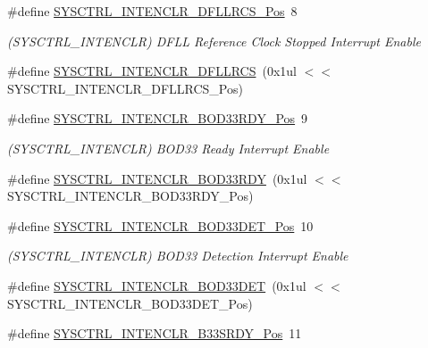 \begin{DoxyCompactItemize}
\item 
\#define \mbox{\hyperlink{group___s_a_m_d21___s_y_s_c_t_r_l_gaac16f8dcaad95639676e9876e47f3d9a}{S\+Y\+S\+C\+T\+R\+L\+\_\+\+I\+N\+T\+E\+N\+C\+L\+R\+\_\+\+D\+F\+L\+L\+R\+C\+S\+\_\+\+Pos}}~8
\begin{DoxyCompactList}\small\item\em (S\+Y\+S\+C\+T\+R\+L\+\_\+\+I\+N\+T\+E\+N\+C\+LR) D\+F\+LL Reference Clock Stopped Interrupt Enable \end{DoxyCompactList}\item 
\#define \mbox{\hyperlink{group___s_a_m_d21___s_y_s_c_t_r_l_ga9cbe6f9fc03e07ab60179a11784bf8c2}{S\+Y\+S\+C\+T\+R\+L\+\_\+\+I\+N\+T\+E\+N\+C\+L\+R\+\_\+\+D\+F\+L\+L\+R\+CS}}~(0x1ul $<$$<$ S\+Y\+S\+C\+T\+R\+L\+\_\+\+I\+N\+T\+E\+N\+C\+L\+R\+\_\+\+D\+F\+L\+L\+R\+C\+S\+\_\+\+Pos)
\item 
\#define \mbox{\hyperlink{group___s_a_m_d21___s_y_s_c_t_r_l_gaffd839278c9726122adc440c025305f0}{S\+Y\+S\+C\+T\+R\+L\+\_\+\+I\+N\+T\+E\+N\+C\+L\+R\+\_\+\+B\+O\+D33\+R\+D\+Y\+\_\+\+Pos}}~9
\begin{DoxyCompactList}\small\item\em (S\+Y\+S\+C\+T\+R\+L\+\_\+\+I\+N\+T\+E\+N\+C\+LR) B\+O\+D33 Ready Interrupt Enable \end{DoxyCompactList}\item 
\#define \mbox{\hyperlink{group___s_a_m_d21___s_y_s_c_t_r_l_gaa82de433283bf30d0a4256306161b820}{S\+Y\+S\+C\+T\+R\+L\+\_\+\+I\+N\+T\+E\+N\+C\+L\+R\+\_\+\+B\+O\+D33\+R\+DY}}~(0x1ul $<$$<$ S\+Y\+S\+C\+T\+R\+L\+\_\+\+I\+N\+T\+E\+N\+C\+L\+R\+\_\+\+B\+O\+D33\+R\+D\+Y\+\_\+\+Pos)
\item 
\#define \mbox{\hyperlink{group___s_a_m_d21___s_y_s_c_t_r_l_ga9f103010cd05fef4a06b9cf38312912a}{S\+Y\+S\+C\+T\+R\+L\+\_\+\+I\+N\+T\+E\+N\+C\+L\+R\+\_\+\+B\+O\+D33\+D\+E\+T\+\_\+\+Pos}}~10
\begin{DoxyCompactList}\small\item\em (S\+Y\+S\+C\+T\+R\+L\+\_\+\+I\+N\+T\+E\+N\+C\+LR) B\+O\+D33 Detection Interrupt Enable \end{DoxyCompactList}\item 
\#define \mbox{\hyperlink{group___s_a_m_d21___s_y_s_c_t_r_l_gae69ec0f16ea4c7bc3bec4a01f858bca5}{S\+Y\+S\+C\+T\+R\+L\+\_\+\+I\+N\+T\+E\+N\+C\+L\+R\+\_\+\+B\+O\+D33\+D\+ET}}~(0x1ul $<$$<$ S\+Y\+S\+C\+T\+R\+L\+\_\+\+I\+N\+T\+E\+N\+C\+L\+R\+\_\+\+B\+O\+D33\+D\+E\+T\+\_\+\+Pos)
\item 
\#define \mbox{\hyperlink{group___s_a_m_d21___s_y_s_c_t_r_l_gae28ea016624679979753b4299a628e49}{S\+Y\+S\+C\+T\+R\+L\+\_\+\+I\+N\+T\+E\+N\+C\+L\+R\+\_\+\+B33\+S\+R\+D\+Y\+\_\+\+Pos}}~11
$$
\end{DoxyCompactItemize}
